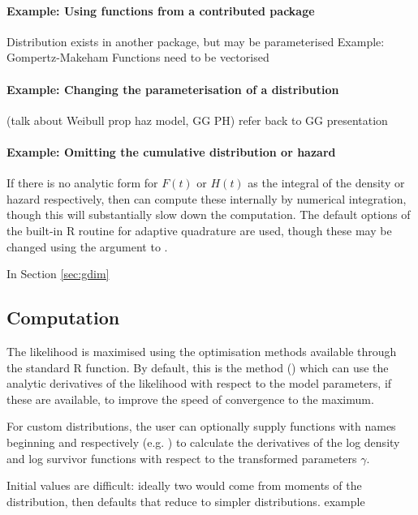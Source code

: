 \documentclass[nojss,nofooter]{jss}\usepackage[]{graphicx}\usepackage[]{color}
\begin{document}
    
\paragraph{Example: Using functions from a contributed package}

Distribution exists in another package, but may be parameterised 
Example: Gompertz-Makeham
Functions need to be vectorised 

\paragraph{Example: Changing the parameterisation of a distribution}

(talk about Weibull prop haz model, GG PH)
refer back to GG presentation 

\paragraph{Example: Omitting the cumulative distribution or hazard}

If there is no analytic form for $F(t)$ or $H(t)$ as the integral of
the density or hazard respectively, then  can compute
these internally by numerical integration, though this will
substantially slow down the computation.  The default options of the
built-in R routine  for adaptive quadrature are used,
though these may be changed using the  argument to
.


In Section \ref{sec:gdim} 


\subsection{Computation}

The likelihood is maximised using the optimisation methods available
through the standard R  function.  By default, this is the
 method (\citep{nash}) which can use the analytic
derivatives of the likelihood with respect to the model parameters, if
these are available, to improve the speed of convergence to the
maximum.

For custom distributions, the user can optionally supply functions
with names beginning  and  respectively
(e.g. ) to calculate the derivatives of
the log density and log survivor functions with respect to the
transformed parameters $\gamma$.

Initial values are difficult: ideally two would come from moments of
the distribution, then defaults that reduce to simpler distributions.
example
\end{document}
